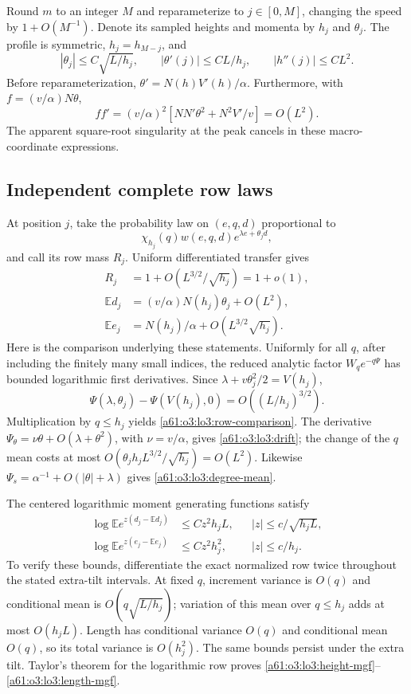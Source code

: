 \documentclass[11pt,letterpaper]{article}
\numberwithin{equation}{section}
\theoremstyle{remark}\newtheorem{remark}[theorem]{Remark}
\begin{document}
Round $m$ to an integer $M$ and reparameterize to $j\in[0,M]$,
changing the speed by $1+O(M^{-1})$. Denote its sampled heights and
momenta by $h_j$ and $\theta_j$. The profile is symmetric,
$h_j=h_{M-j}$, and
\begin{equation}\label{a61:o3:lo3:profile-regularity}
 |\theta_j|\le C\sqrt{L/h_j},\qquad
 |\theta'(j)|\le CL/h_j,\qquad |h''(j)|\le CL^2.
\end{equation}
Before reparameterization,
$\theta'=N(h)V'(h)/\alpha$. Furthermore, with
$f=(v/\alpha)N\theta$,
\[
 ff'=(v/\alpha)^2
       [NN'\theta^2+N^2V'/v]=O(L^2).
\]
The apparent square-root singularity at the peak cancels in these
macro-coordinate expressions.

\subsection{Independent complete row laws}

At position $j$, take the probability law on $(e,q,d)$ proportional
to
\[
 \chi_{h_j}(q)w(e,q,d)e^{\lambda e+\theta_jd},
\]
and call its row mass $R_j$. Uniform differentiated transfer gives
\begin{align}
 R_j&=1+O(L^{3/2}/\sqrt{h_j})=1+o(1),
                 \label{a61:o3:lo3:row-comparison}\\
 \mathbb Ed_j&=(v/\alpha)N(h_j)\theta_j+O(L^2),
                 \label{a61:o3:lo3:drift}\\
 \mathbb Ee_j&=N(h_j)/\alpha+O(L^{3/2}\sqrt{h_j}).
                 \label{a61:o3:lo3:degree-mean}
\end{align}
Here is the comparison underlying these statements. Uniformly for
all $q$, after including the finitely many small indices, the
reduced analytic factor $W_qe^{-q\Psi}$ has bounded logarithmic
first derivatives. Since
$\lambda+v\theta_j^2/2=V(h_j)$,
\[
 \Psi(\lambda,\theta_j)-\Psi(V(h_j),0)
       =O((L/h_j)^{3/2}).
\]
Multiplication by $q\le h_j$ yields
\eqref{a61:o3:lo3:row-comparison}. The derivative
$\Psi_\theta=\nu\theta+O(\lambda+\theta^2)$, with
$\nu=v/\alpha$, gives \eqref{a61:o3:lo3:drift}; the change of the $q$ mean
costs at most
$O(\theta_jh_jL^{3/2}/\sqrt{h_j})=O(L^2)$.
Likewise $\Psi_s=\alpha^{-1}+O(|\theta|+\lambda)$ gives
\eqref{a61:o3:lo3:degree-mean}.

The centered logarithmic moment generating functions satisfy
\begin{align}
 \log\mathbb Ee^{z(d_j-\mathbb Ed_j)}
     &\le Cz^2h_jL,
          &&|z|\le c/\sqrt{h_jL},\label{a61:o3:lo3:height-mgf}\\
 \log\mathbb Ee^{z(e_j-\mathbb Ee_j)}
     &\le Cz^2h_j^2,
          &&|z|\le c/h_j.\label{a61:o3:lo3:length-mgf}
\end{align}
To verify these bounds, differentiate the exact normalized row twice
throughout the stated extra-tilt intervals. At fixed $q$, increment
variance is $O(q)$ and conditional mean is
$O(q\sqrt{L/h_j})$; variation of this mean over $q\le h_j$ adds at
most $O(h_jL)$. Length has conditional variance $O(q)$ and conditional
mean $O(q)$, so its total variance is $O(h_j^2)$. The same bounds
persist under the extra tilt. Taylor's theorem for the logarithmic
row proves \eqref{a61:o3:lo3:height-mgf}--\eqref{a61:o3:lo3:length-mgf}.
\end{document}
